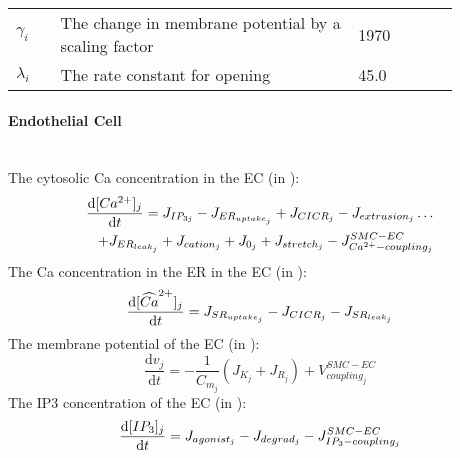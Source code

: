 \begin{table}[h!]
\centering
\begin{tabular}{| p{0.09\linewidth} | >{\footnotesize} p{0.6\linewidth} | >{\footnotesize} p{0.17\linewidth} | >{\footnotesize} p{0.02\linewidth} |}
\arrayrulecolor{lightgrey}\hline
$\gamma_{i}$				& The change in membrane potential by a scaling factor					& 1970 \mVpuM	& \cite{Koenigsberger2006} \\
$\lambda_{i} $				& The rate constant for opening											& 45.0 \pers 	& \cite{Koenigsberger2006} \\
\hline
\end{tabular}
\label{tab:dcidt}
\end{table}

\paragraph{Endothelial Cell}~\\
%
The cytosolic \gls{Ca} concentration in the \gls{EC} (in \uM):
\begin{equation} \label{eq:cj}
\begin{split}
\dfrac{\mathrm{d}[Ca^{2+}]_{j}}{\mathrm{d}t} = J_{IP_{3j}} - J_{ER_{uptake_{j}}} + J_{CICR_{j}} - J_{extrusion_{j}}\dots \\
 + J_{ER_{leak_{j}}} + J_{cation_{j}} + J_{0_{j}} + J_{stretch_{j}} - J_{Ca^{2+}-coupling_{j}}^{SMC-EC}
\end{split}
\end{equation}
%
The \gls{Ca} concentration in the \gls{ER} in the \gls{EC} (in \uM): %
\begin{equation} \label{eq:sj}
\dfrac{\mathrm{d}[\widehat{Ca}^{2+}]_{j}}{\mathrm{d}t} =  J_{SR_{uptake_{j}}} - J_{CICR_{j}} - J_{SR_{leak_{j}}}
\end{equation}
%
The membrane potential of the \gls{EC} (in \mV):
\begin{equation} \label{eq:dvjdt}
\dfrac{\mathrm{d}v_{j}}{\mathrm{d}t} =-\frac{1}{C_{m_{j}}} ( J_{K_{j}}+J_{R_{j}}) + V^{SMC-EC}_{coupling_{j}}
\end{equation}
%
The \gls{IP3} concentration of the \gls{EC} (in \uM):
\begin{equation} \label{eq:dIjdt}
\dfrac{\mathrm{d}[IP_{3}]_{j}}{\mathrm{d}t} =  J_{agonist_{j}}- J_{degrad_{j}}  - J^{SMC-EC}_{IP_{3}-coupling_{j}}
\end{equation}

